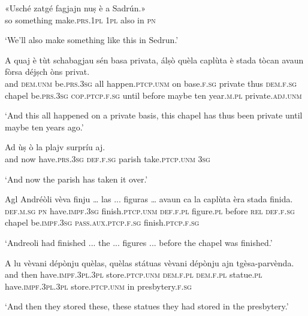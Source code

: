 \begin{linenumbers}
\gll «Usché zatgé fagjajn nuṣ è a Sadrún.»   \\
so something make.\textsc{prs.1pl} \textsc{1pl} also in \textsc{pn} \ \\
\end{linenumbers}
\medskip
\glt `We’ll also make something like this in Sedrun.'
\medskip

\begin{linenumbers}
\gll  A quaj è tùt schabagjau sén basa privata, álṣò quèla caplùta è stada tòcan avaun fòrsa déjṣch òns privat.  \\
and \textsc{dem.unm} be.\textsc{prs.3sg} all happen.\textsc{ptcp.unm} on base.\textsc{f.sg} private thus \textsc{dem.f.sg} chapel  be.\textsc{prs.3sg} \textsc{cop.ptcp.f.sg} until before maybe ten year.\textsc{m.pl} private.\textsc{adj.unm}\\
\end{linenumbers}
\medskip
\glt `And this all happened on a private basis, this chapel has thus been private until maybe ten years ago.'
\medskip

\begin{linenumbers}
\gll  Ad ùṣ ò la plajv surpríu aj.  \\
and now have.\textsc{prs.3sg} \textsc{def.f.sg} parish take.\textsc{ptcp.unm} \textsc{3sg}  \\
\end{linenumbers}
\medskip
\glt `And now the parish has taken it over.'
\medskip

\begin{linenumbers}
\gll  Agl Andréòli vèva finju … las ... figuras … avaun ca la caplùta èra stada finida. \\
 \textsc{def.m.sg} \textsc{pn} have.\textsc{impf.3sg} finish.\textsc{ptcp.unm} {} \textsc{def.f.pl} {} figure.\textsc{pl} {} before \textsc{rel} \textsc{def.f.sg} chapel be.\textsc{impf.3sg} \textsc{pass.aux.ptcp.f.sg} finish.\textsc{ptcp.f.sg} \\
\end{linenumbers}
\medskip
\glt `Andreoli had finished ... the ... figures ... before the chapel was finished.'
\medskip

\begin{linenumbers}
\gll  A lu vèvani dépònju quèlas, quèlas státuas vèvani dépònju ajn tgèsa-parvènda.\\
and then have.\textsc{impf.3pl.3pl} store.\textsc{ptcp.unm} \textsc{dem.f.pl} \textsc{dem.f.pl} statue.\textsc{pl} have.\textsc{impf.3pl.3pl} store.\textsc{ptcp.unm} in presbytery.\textsc{f.sg}\\
\end{linenumbers}
\medskip
\glt `And then they stored these, these statues they had stored in the presbytery.'
\medskip

